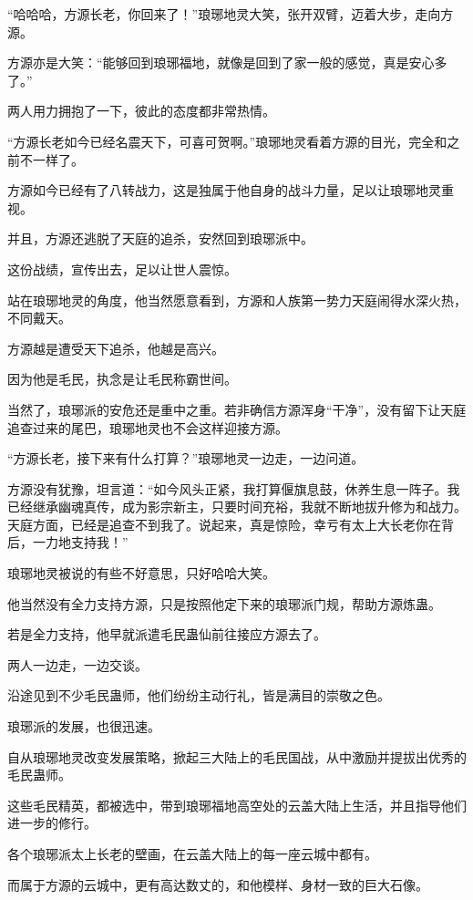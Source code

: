 
\begin{this_body}

“哈哈哈，方源长老，你回来了！”琅琊地灵大笑，张开双臂，迈着大步，走向方源。

方源亦是大笑：“能够回到琅琊福地，就像是回到了家一般的感觉，真是安心多了。”

两人用力拥抱了一下，彼此的态度都非常热情。

“方源长老如今已经名震天下，可喜可贺啊。”琅琊地灵看着方源的目光，完全和之前不一样了。

方源如今已经有了八转战力，这是独属于他自身的战斗力量，足以让琅琊地灵重视。

并且，方源还逃脱了天庭的追杀，安然回到琅琊派中。

这份战绩，宣传出去，足以让世人震惊。

站在琅琊地灵的角度，他当然愿意看到，方源和人族第一势力天庭闹得水深火热，不同戴天。

方源越是遭受天下追杀，他越是高兴。

因为他是毛民，执念是让毛民称霸世间。

当然了，琅琊派的安危还是重中之重。若非确信方源浑身“干净”，没有留下让天庭追查过来的尾巴，琅琊地灵也不会这样迎接方源。

“方源长老，接下来有什么打算？”琅琊地灵一边走，一边问道。

方源没有犹豫，坦言道：“如今风头正紧，我打算偃旗息鼓，休养生息一阵子。我已经继承幽魂真传，成为影宗新主，只要时间充裕，我就不断地拔升修为和战力。天庭方面，已经是追查不到我了。说起来，真是惊险，幸亏有太上大长老你在背后，一力地支持我！”

琅琊地灵被说的有些不好意思，只好哈哈大笑。

他当然没有全力支持方源，只是按照他定下来的琅琊派门规，帮助方源炼蛊。

若是全力支持，他早就派遣毛民蛊仙前往接应方源去了。

两人一边走，一边交谈。

沿途见到不少毛民蛊师，他们纷纷主动行礼，皆是满目的崇敬之色。

琅琊派的发展，也很迅速。

自从琅琊地灵改变发展策略，掀起三大陆上的毛民国战，从中激励并提拔出优秀的毛民蛊师。

这些毛民精英，都被选中，带到琅琊福地高空处的云盖大陆上生活，并且指导他们进一步的修行。

各个琅琊派太上长老的壁画，在云盖大陆上的每一座云城中都有。

而属于方源的云城中，更有高达数丈的，和他模样、身材一致的巨大石像。


\end{this_body}
